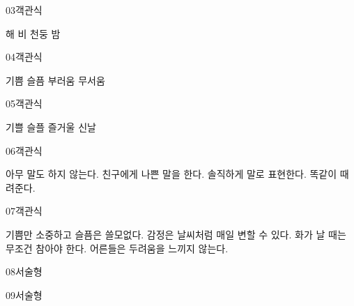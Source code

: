 \documentclass[fs13,seriesSau]{korfarm-base}
\begin{document}
\begin{kfQBlock}{03}{객관식}
\begin{kfChoices}
\kfChoice 해
\kfChoice 비
\kfChoice 천둥
\kfChoice 밤
\end{kfChoices}
\end{kfQBlock}

\begin{kfQBlock}{04}{객관식}
\begin{kfChoices}
\kfChoice 기쁨
\kfChoice 슬픔
\kfChoice 부러움
\kfChoice 무서움
\end{kfChoices}
\end{kfQBlock}

\begin{kfQBlock}{05}{객관식}
\begin{kfChoices}
\kfChoice 기쁠
\kfChoice 슬플
\kfChoice 즐거울
\kfChoice 신날
\end{kfChoices}
\end{kfQBlock}

\begin{kfQBlock}{06}{객관식}
\begin{kfChoices}
\kfChoice 아무 말도 하지 않는다.
\kfChoice 친구에게 나쁜 말을 한다.
\kfChoice 솔직하게 말로 표현한다.
\kfChoice 똑같이 때려준다.
\end{kfChoices}
\end{kfQBlock}

\begin{kfQBlock}{07}{객관식}
\begin{kfChoices}
\kfChoice 기쁨만 소중하고 슬픔은 쓸모없다.
\kfChoice 감정은 날씨처럼 매일 변할 수 있다.
\kfChoice 화가 날 때는 무조건 참아야 한다.
\kfChoice 어른들은 두려움을 느끼지 않는다.
\end{kfChoices}
\end{kfQBlock}

\begin{kfQBlock}{08}{서술형}
\end{kfQBlock}

\begin{kfQBlock}{09}{서술형}
\end{kfQBlock}
\end{document}
